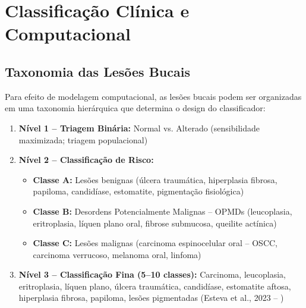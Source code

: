 
\section{Classificação Clínica e Computacional}
\label{sec:class-lesoes}

\subsection{Taxonomia das Lesões Bucais}

Para efeito de modelagem computacional, as lesões bucais podem ser organizadas
em uma taxonomia hierárquica que determina o design do classificador:

\begin{enumerate}
  \item \textbf{Nível 1 -- Triagem Binária:}
        Normal vs. Alterado (sensibilidade maximizada; triagem populacional)

  \item \textbf{Nível 2 -- Classificação de Risco:}
        \begin{itemize}
          \item \textbf{Classe A:} Lesões benignas (úlcera traumática, hiperplasia
                fibrosa, papiloma, candidíase, estomatite, pigmentação fisiológica)
          \item \textbf{Classe B:} Desordens Potencialmente Malignas -- OPMDs
                (leucoplasia, eritroplasia, líquen plano oral, fibrose submucosa,
                queilite actínica)
          \item \textbf{Classe C:} Lesões malignas (carcinoma espinocelular oral
                -- OSCC, carcinoma verrucoso, melanoma oral, linfoma)
        \end{itemize}

  \item \textbf{Nível 3 -- Classificação Fina (5--10 classes):}
        Carcinoma, leucoplasia, eritroplasia, líquen plano, úlcera traumática,
        candidíase, estomatite aftosa, hiperplasia fibrosa, papiloma, lesões
        pigmentadas (Esteva et al., 2023 -- )
\end{enumerate}


